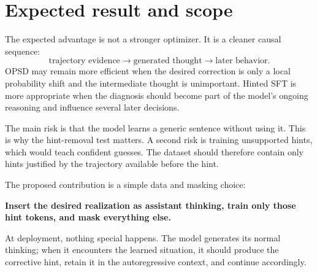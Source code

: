 \section{Expected result and scope}

The expected advantage is not a stronger optimizer. It is a cleaner causal sequence:
\[
  \text{trajectory evidence}
  \longrightarrow
  \text{generated thought}
  \longrightarrow
  \text{later behavior}.
\]
OPSD may remain more efficient when the desired correction is only a local probability
shift and the intermediate thought is unimportant. Hinted SFT is more appropriate when
the diagnosis should become part of the model's ongoing reasoning and influence several
later decisions.

The main risk is that the model learns a generic sentence without using it. This is why
the hint-removal test matters. A second risk is training unsupported hints, which would
teach confident guesses. The dataset should therefore contain only hints justified by
the trajectory available before the hint.

The proposed contribution is a simple data and masking choice:

\begin{center}
  \textbf{Insert the desired realization as assistant thinking, train only those hint
  tokens, and mask everything else.}
\end{center}

At deployment, nothing special happens. The model generates its normal thinking; when it
encounters the learned situation, it should produce the corrective hint, retain it in the
autoregressive context, and continue accordingly.
